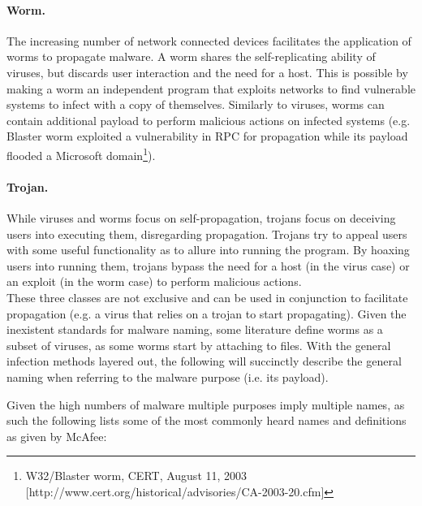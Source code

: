 \documentclass{llncs}
\begin{document}
\paragraph{Worm.} The increasing number of network connected devices facilitates the application of worms to propagate malware. A worm shares the self-replicating ability of viruses, but discards user interaction and the need for a host. This is possible by making a worm an independent program that exploits networks to find vulnerable systems to infect with a copy of themselves\cite{chen:evolution}. Similarly to viruses, worms can contain additional payload to perform malicious actions on infected systems (e.g. Blaster worm exploited a vulnerability in RPC for propagation while its payload flooded a Microsoft domain\footnote{W32/Blaster worm, CERT, August 11, 2003 [http://www.cert.org/historical/advisories/CA-2003-20.cfm]}).

\paragraph{Trojan.} While viruses and worms focus on self-propagation, trojans focus on deceiving users into executing them, disregarding propagation. Trojans try to appeal users with some useful functionality as to allure into running the program\cite{szor:art}. By hoaxing users into running them, trojans bypass the need for a host (in the virus case) or an exploit (in the worm case) to perform malicious actions.\\

These three classes are not exclusive and can be used in conjunction to facilitate propagation (e.g. a virus that relies on a trojan to start propagating). Given the inexistent standards for malware naming, some literature\cite{szor:art} define worms as a subset of viruses, as some worms start by attaching to files. With the general infection methods layered out, the following will succinctly describe the general naming when referring to the malware purpose (i.e. its payload).

Given the high numbers of malware multiple purposes imply multiple names, as such the following lists some of the most commonly heard names and definitions as given by McAfee\cite{mcafee:glossary}:
\end{document}
